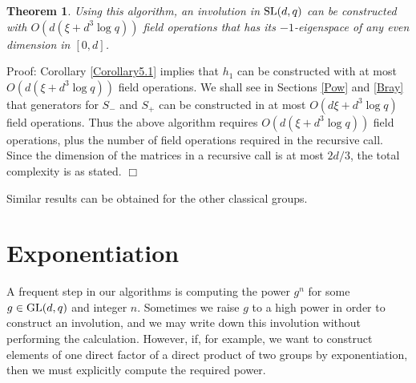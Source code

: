 \documentclass[12pt]{article}
\newtheorem{theorem}[definition]{Theorem}
\newenvironment{proof}{\normalsize {\sc Proof}:}{{\hfill $\Box$ \\}}
\def\SL{{\rm SL}}
\def\GL{{\rm GL}}
\begin{document}
\begin{theorem}\label{Corollary5.2}  
Using this algorithm, an involution in $\SL(d,q)$
can be constructed with $O(d(\xi + d^3 \log q))$ field operations that has its
$-1$-eigenspace of any even dimension in $[0,d]$.
\end{theorem}
\begin{proof}
Corollary \ref{Corollary5.1} implies that $h_1$ can be constructed with at most 
$O(d(\xi + d^3 \log q))$ field operations. We shall see in 
Sections \ref{Pow} and \ref{Bray} 
that generators for $S_-$ and $S_+$ can be constructed
in at most $O(d \xi + d^3 \log q)$ field operations. Thus the above algorithm requires
$O(d(\xi + d^3 \log q))$ field operations, plus the number of field operations
required in the recursive call. Since the dimension of the matrices
in a recursive call is at most $2d/3$, the total
complexity is as stated.
\end{proof}

\noindent
Similar results can be obtained for the other classical groups.

\section{Exponentiation}
\label{Exp}

A frequent step in our algorithms is computing the 
power $g^n$ for some $g\in \GL(d,q)$ and integer $n$.
Sometimes we raise $g$ to a high power in order to construct an
involution, and we may write down
this involution without performing the calculation. However, if, for example, 
we want to construct elements of one direct factor of a direct product 
of two groups by exponentiation, then we must explicitly
compute the required power. 
\end{document}
